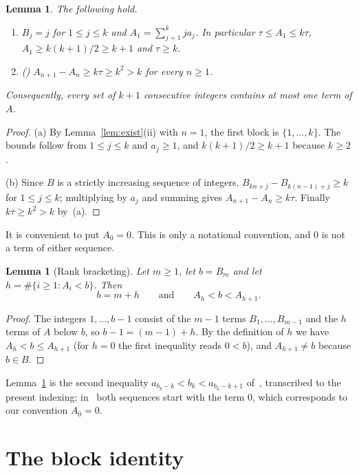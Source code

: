 \documentclass{amsart}
\newtheorem{lemma}[theorem]{Lemma}
\theoremstyle{definition}
\theoremstyle{remark}
\numberwithin{equation}{section}
\numberwithin{table}{section}
\begin{document}
\begin{lemma}\label{lem:initial}
The following hold.
\begin{enumerate}
\item[(a)] $B_j=j$ for $1\le j\le k$ and $A_1=\sum_{j=1}^k ja_j$. In particular $\tau\le A_1\le k\tau$, $A_1\ge k(k+1)/2\ge k+1$ and $\tau\ge k$.
\item[(b)] {\rm(\cite[Lemma~1]{FJ})} $A_{n+1}-A_n\ge k\tau\ge k^2>k$ for every $n\ge1$.
\end{enumerate}
Consequently, every set of $k+1$ consecutive integers contains at most one term of $A$.
\end{lemma}

\begin{proof}
(a) By Lemma~\ref{lem:exist}(ii) with $n=1$, the first block is $\{1,\dots,k\}$. The bounds follow from $1\le j\le k$ and $a_j\ge1$, and $k(k+1)/2\ge k+1$ because $k\ge2$.

(b) Since $B$ is a strictly increasing sequence of integers, $B_{kn+j}-B_{k(n-1)+j}\ge k$ for $1\le j\le k$; multiplying by $a_j$ and summing gives $A_{n+1}-A_n\ge k\tau$. Finally $k\tau\ge k^2>k$ by~(a).
\end{proof}

It is convenient to put $A_0=0$. This is only a notational convention, and $0$ is not a term of either sequence.

\begin{lemma}[Rank bracketing]\label{lem:rank}
Let $m\ge1$, let $b=B_m$ and let $h=\#\{i\ge1:A_i<b\}$. Then
\[
b=m+h\qquad\text{and}\qquad A_h<b<A_{h+1}.
\]
\end{lemma}

\begin{proof}
The integers $1,\dots,b-1$ consist of the $m-1$ terms $B_1,\dots,B_{m-1}$ and the $h$ terms of $A$ below $b$, so $b-1=(m-1)+h$. By the definition of $h$ we have $A_h<b\le A_{h+1}$ (for $h=0$ the first inequality reads $0<b$), and $A_{h+1}\ne b$ because $b\in B$.
\end{proof}

Lemma~\ref{lem:rank} is the second inequality $a_{b_k-k}<b_k<a_{b_k-k+1}$ of~\cite[Theorem~3.2]{FP}, transcribed to the present indexing; in~\cite{FP} both sequences start with the term $0$, which corresponds to our convention $A_0=0$.

\section{The block identity}\label{sec:block}
\end{document}

